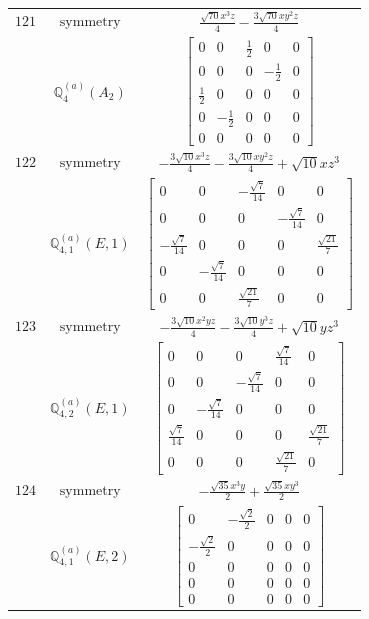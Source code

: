 \documentclass[fleqn,8pt,landscape]{jsarticle}
\begin{document}
\begin{longtable}{ccc}
$ 121 $ & $ \text{symmetry} $ & $ \frac{\sqrt{70} x^{3} z}{4} - \frac{3 \sqrt{70} x y^{2} z}{4} $ \\
$  $ & $ \mathbb{Q}_{4}^{(a)}(A_{2}) $ & $ \begin{bmatrix} 0 & 0 & \frac{1}{2} & 0 & 0 \\ 0 & 0 & 0 & - \frac{1}{2} & 0 \\ \frac{1}{2} & 0 & 0 & 0 & 0 \\ 0 & - \frac{1}{2} & 0 & 0 & 0 \\ 0 & 0 & 0 & 0 & 0 \end{bmatrix} $ \\ \hline
$ 122 $ & $ \text{symmetry} $ & $ - \frac{3 \sqrt{10} x^{3} z}{4} - \frac{3 \sqrt{10} x y^{2} z}{4} + \sqrt{10} x z^{3} $ \\
$  $ & $ \mathbb{Q}_{4,1}^{(a)}(E,1) $ & $ \begin{bmatrix} 0 & 0 & - \frac{\sqrt{7}}{14} & 0 & 0 \\ 0 & 0 & 0 & - \frac{\sqrt{7}}{14} & 0 \\ - \frac{\sqrt{7}}{14} & 0 & 0 & 0 & \frac{\sqrt{21}}{7} \\ 0 & - \frac{\sqrt{7}}{14} & 0 & 0 & 0 \\ 0 & 0 & \frac{\sqrt{21}}{7} & 0 & 0 \end{bmatrix} $ \\ \hline
$ 123 $ & $ \text{symmetry} $ & $ - \frac{3 \sqrt{10} x^{2} y z}{4} - \frac{3 \sqrt{10} y^{3} z}{4} + \sqrt{10} y z^{3} $ \\
$  $ & $ \mathbb{Q}_{4,2}^{(a)}(E,1) $ & $ \begin{bmatrix} 0 & 0 & 0 & \frac{\sqrt{7}}{14} & 0 \\ 0 & 0 & - \frac{\sqrt{7}}{14} & 0 & 0 \\ 0 & - \frac{\sqrt{7}}{14} & 0 & 0 & 0 \\ \frac{\sqrt{7}}{14} & 0 & 0 & 0 & \frac{\sqrt{21}}{7} \\ 0 & 0 & 0 & \frac{\sqrt{21}}{7} & 0 \end{bmatrix} $ \\ \hline
$ 124 $ & $ \text{symmetry} $ & $ - \frac{\sqrt{35} x^{3} y}{2} + \frac{\sqrt{35} x y^{3}}{2} $ \\
$  $ & $ \mathbb{Q}_{4,1}^{(a)}(E,2) $ & $ \begin{bmatrix} 0 & - \frac{\sqrt{2}}{2} & 0 & 0 & 0 \\ - \frac{\sqrt{2}}{2} & 0 & 0 & 0 & 0 \\ 0 & 0 & 0 & 0 & 0 \\ 0 & 0 & 0 & 0 & 0 \\ 0 & 0 & 0 & 0 & 0 \end{bmatrix} $ \\ \hline

\end{longtable}
\end{document}
